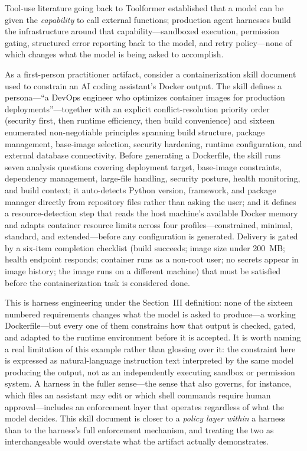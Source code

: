\documentclass[journal]{IEEEtran}
\begin{document}
Tool-use literature going back to Toolformer \cite{schick2023toolformer} established that a model can be given the \emph{capability} to call external functions; production agent harnesses build the infrastructure around that capability---sandboxed execution, permission gating, structured error reporting back to the model, and retry policy---none of which changes what the model is being asked to accomplish.

As a first-person practitioner artifact, consider a containerization skill document used to constrain an AI coding assistant's Docker output. The skill defines a persona---``a DevOps engineer who optimizes container images for production deployments''---together with an explicit conflict-resolution priority order (security first, then runtime efficiency, then build convenience) and sixteen enumerated non-negotiable principles spanning build structure, package management, base-image selection, security hardening, runtime configuration, and external database connectivity. Before generating a Dockerfile, the skill runs seven analysis questions covering deployment target, base-image constraints, dependency management, large-file handling, security posture, health monitoring, and build context; it auto-detects Python version, framework, and package manager directly from repository files rather than asking the user; and it defines a resource-detection step that reads the host machine's available Docker memory and adapts container resource limits across four profiles---constrained, minimal, standard, and extended---before any configuration is generated. Delivery is gated by a six-item completion checklist (build succeeds; image size under 200~MB; health endpoint responds; container runs as a non-root user; no secrets appear in image history; the image runs on a different machine) that must be satisfied before the containerization task is considered done.

This is harness engineering under the Section~III definition: none of the sixteen numbered requirements changes what the model is asked to produce---a working Dockerfile---but every one of them constrains how that output is checked, gated, and adapted to the runtime environment before it is accepted. It is worth naming a real limitation of this example rather than glossing over it: the constraint here is expressed as natural-language instruction text interpreted by the same model producing the output, not as an independently executing sandbox or permission system. A harness in the fuller sense---the sense that also governs, for instance, which files an assistant may edit or which shell commands require human approval---includes an enforcement layer that operates regardless of what the model decides. This skill document is closer to a \emph{policy layer within} a harness than to the harness's full enforcement mechanism, and treating the two as interchangeable would overstate what the artifact actually demonstrates.
\end{document}
